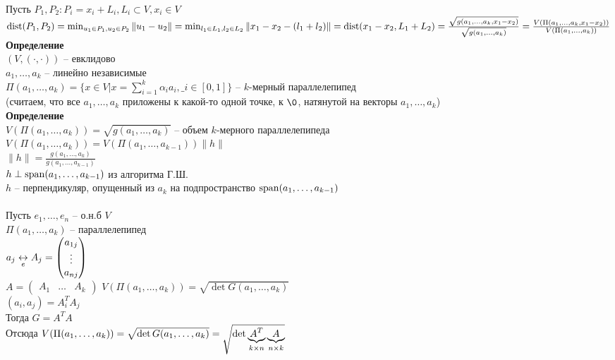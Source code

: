 \documentclass[12pt]{article}
\begin{document}
Пусть $P_1, P_2: P_i = x_i + L_i, L_i \subset V, x_i \in V$\\
$\dist(P_1, P_2) = \min_{u_1\in P_1, u_2 \in P_2} \|u_1 - u_2\| = \min_{l_1 \in L_1, l_2 \in L_2} \|x_1 - x_2 - (l_1 + l_2)\| = \dist(x_1 - x_2, L_1 + L_2) = \frac{\sqrt{g(a_1, \ldots, a_k, x_1-x_2)}}{\sqrt{g(a_1, \ldots, a_k)}} = \frac{V(\Pi(a_1, \ldots, a_k, x_1-x_2))}{V(\Pi(a_1, \ldots, a_k))}$\\
\textbf{Определение}\\
$(V, (\cdot, \cdot))$ -- евклидово\\
$a_1, \ldots, a_k$ -- линейно независимые\\
$\Pi(a_1, \ldots, a_k) = \{x \in V | x = \sum_{i=1}^k \alpha_i a_i, \_i \in [0, 1]\}$ -- $k$-мерный параллелепипед\\
(считаем, что все $a_1, \ldots, a_k$ приложены к какой-то одной точке, к $\0$, натянутой на векторы $a_1, \ldots, a_k$)\\
\textbf{Определение}\\
$V(\Pi(a_1, \ldots, a_k)) = \sqrt{g(a_1, \ldots, a_k)}$ -- объем $k$-мерного параллелепипеда\\
$V(\Pi(a_1, \ldots, a_k)) = V(\Pi(a_1, \ldots, a_{k-1}))\|h\|$\\
$\|h\| = \frac{g(a_1, \ldots, a_k)}{g(a_1, \ldots, a_{k-1})}$\\
$h \perp \span(a_1, \ldots, a_{k-1})$ из алгоритма Г.Ш.\\
$h$ -- перпендикуляр, опущенный из $a_k$ на подпространство $\span(a_1, \ldots, a_{k-1})$\\\\
Пусть $e_1, \ldots, e_n$ -- о.н.б $V$\\
$\Pi(a_1, \ldots, a_k)$ -- параллелепипед\\
$a_j \us e\lrto A_j = \begin{pmatrix}
    a_{1j}\\\vdots\\a_{nj}
\end{pmatrix}$\\
$A = \begin{pmatrix}
    A_1 & \ldots & A_k
\end{pmatrix}$
$V(\Pi(a_1, \ldots, a_k)) = \sqrt{\det G(a_1, \ldots, a_k)}$\\
$(a_i, a_j) = A_i^T A_j$\\
Тогда $G = A^TA$\\
Отсюда $V(\Pi(a_1, \ldots, a_k)) = \sqrt{\det G(a_1, \ldots, a_k)} = \sqrt{\det \ub{k\times n}{A^T} \ub{n\times k}A}$\\
\end{document}
